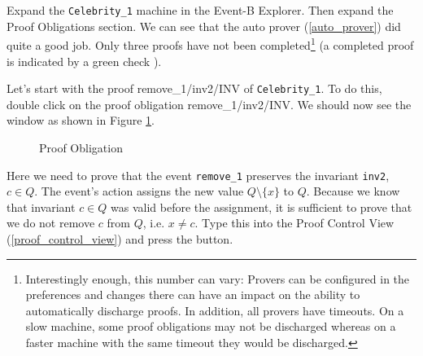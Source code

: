 Expand the \texttt{Celebrity\_1} machine in the \textsf{Event-B Explorer}. Then expand the \textsf{Proof Obligations} section. We can see that the auto prover (\ref{auto_prover}) did quite a good job. Only three proofs have not been completed\footnote{Interestingly enough, this number can vary: Provers can be configured in the preferences and changes there can have an impact on the ability to automatically discharge proofs.  In addition, all provers have timeouts.  On a slow machine, some proof obligations may not be discharged whereas on a faster machine with the same timeout they would be discharged.}  (a completed proof is indicated by a green check ). 


Let's start with the proof \textsf{remove\_1/inv2/INV} of \texttt{Celebrity\_1}.
To do this, double click on the proof obligation \textsf{remove\_1/inv2/INV}.
We should now see the window as shown in Figure \ref{fig_tut_08_proof_obligation}.


\begin{figure}[!ht]
\begin{center}
	\caption{Proof Obligation}
	\label{fig_tut_08_proof_obligation}
\end{center}
\end{figure}


Here we need to prove that the event \texttt{remove\_1} preserves the invariant \texttt{inv2},
  $c\in Q$.
The event's action assigns the new value $Q\setminus \{x\}$ to $Q$.
Because we know that invariant $c\in Q$ was valid before the assignment, 
 it is sufficient to prove that we do not remove $c$ from $Q$, i.e. \textsf{$x \neq c$}. Type this into the \textsf{Proof Control View} (\ref{proof_control_view}) and press the \textsf{ button}. 

